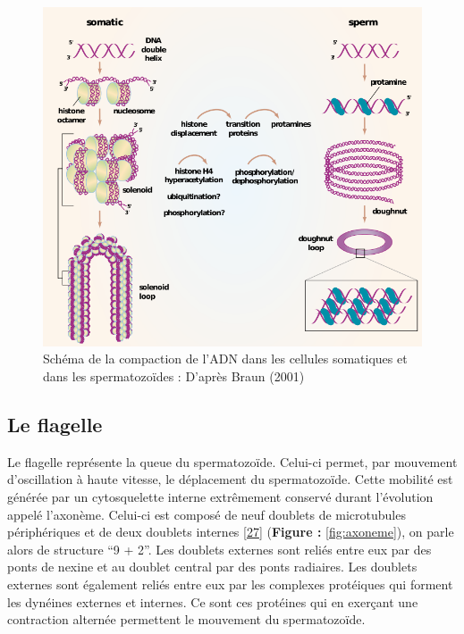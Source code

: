 \documentclass[12pt,twoside]{reedthesis}
\theoremstyle{definition}
\theoremstyle{definition}
\theoremstyle{remark}
\begin{document}
  \newpage
  
  \begin{figure}
  
  {\centering \includegraphics[scale=.55]{figure/noyau} 
  
  }
  
  \caption[Schéma de la compaction de l’ADN dans les cellules somatiques et dans les spermatozoïdes]{Schéma de la compaction de l’ADN dans les cellules somatiques et dans les spermatozoïdes : D'après Braun (2001)}\label{fig:noyau}
  \end{figure}
  
  \newpage
  
  \subsection{Le flagelle}\label{le-flagelle}
  
  Le flagelle représente la queue du spermatozoïde. Celui-ci permet, par
  mouvement d'oscillation à haute vitesse, le déplacement du
  spermatozoïde. Cette mobilité est générée par un cytosquelette interne
  extrêmement conservé durant l'évolution appelé l'axonème. Celui-ci est
  composé de neuf doublets de microtubules périphériques et de deux
  doublets internes {[}\protect\hyperlink{ref-Inaba2003}{27}{]}
  (\textbf{Figure : }\ref{fig:axoneme}), on parle alors de structure ``9 +
  2''. Les doublets externes sont reliés entre eux par des ponts de nexine
  et au doublet central par des ponts radiaires. Les doublets externes
  sont également reliés entre eux par les complexes protéiques qui forment
  les dynéines externes et internes. Ce sont ces protéines qui en exerçant
  une contraction alternée permettent le mouvement du spermatozoïde.
  
\end{document}
